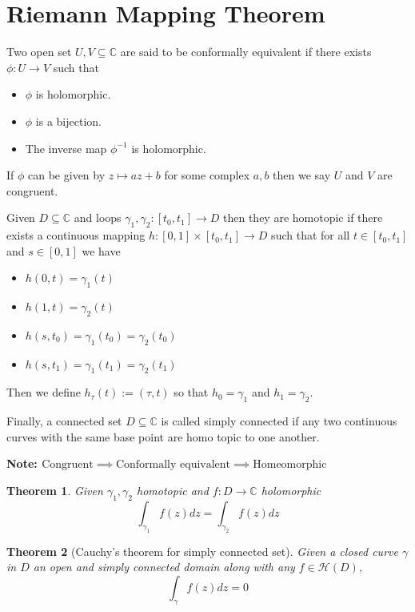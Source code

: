 \documentclass[11pt]{article}
\newcommand{\defeq}{:=}
\newcommand{\C}{\mathbb{C}}
\newenvironment{defin}
	{\begin{mdframed}[backgroundcolor=white, roundcorner=5pt, linewidth=1pt]}
	{\end{mdframed}}
\newcommand{\mdf}[1]{{\color{red} #1}}
\newenvironment{note}
	{\begin{mdframed}[backgroundcolor=white, linecolor=red, roundcorner=5pt, linewidth=1pt]\bfseries{Note:}\normalfont}
	{\end{mdframed}}
\newtheorem{theorem}{Theorem}[section]
\begin{document}
\section{Riemann Mapping Theorem}

\begin{defin}
	Two open set $U, V\subseteq\C$ are said to be \mdf{conformally equivalent} if there exists $\phi:U \to V$ such that
	\begin{itemize}
		\item $\phi$ is holomorphic.
		\item $\phi$ is a bijection.
		\item The inverse map $\phi^{-1}$ is holomorphic.
	\end{itemize}
	If $\phi$ can be given by $z\mapsto az+b$ for some complex $a, b$ then we say $U$ and $V$ are \mdf{congruent}.

	Given $D\subseteq\C$ and loops $\gamma_1, \gamma_2:[t_0, t_1]\to D$ then they are \mdf{homotopic} if there exists a continuous mapping $h:[0, 1]\times[t_0, t_1]\to D$ such that for all $t\in[t_0, t_1]$ and $s\in[0, 1]$ we have
	\begin{itemize}
		\item $h(0, t)= \gamma_1(t)$
		\item $h(1, t)=\gamma_2(t)$
		\item $h(s, t_0)=\gamma_1(t_0)=\gamma_2(t_0)$
		\item $h(s, t_1)= \gamma_1(t_1)=\gamma_2(t_1)$
	\end{itemize}
	Then we define $h_\tau(t)\defeq(\tau, t)$ so that $h_0=\gamma_1$ and $h_1=\gamma_2$.

	Finally, a connected set $D\subseteq\C$ is called \mdf{simply connected} if any two continuous curves with the same base point are homo topic to one another. 
\end{defin}
\begin{note}
	$\text{Congruent}\implies\text{Conformally equivalent}\implies\text{Homeomorphic}$
\end{note}

\begin{theorem}
Given $\gamma_1, \gamma_2$ homotopic and $f:D\to\C$ holomorphic
\[
	\int_{ \gamma_1 }f(z) dz = \int_{\gamma_2 }f(z)dz
\]
\end{theorem}

\begin{theorem}[Cauchy's theorem for simply connected set]
Given a closed curve $\gamma$ in $D$ an open and simply connected domain along with any $f\in\mathcal{H}(D)$,
\[
	\int_\gamma f(z)dz=0
\]
\end{theorem}
\end{document}
